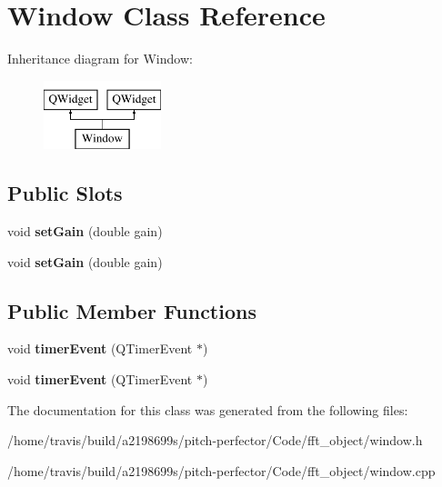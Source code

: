 \hypertarget{classWindow}{\section{Window Class Reference}
\label{classWindow}
}
Inheritance diagram for Window\-:\begin{figure}[H]
\begin{center}
\leavevmode
\includegraphics[height=2.000000cm]{classWindow}
\end{center}
\end{figure}
\subsection*{Public Slots}
\begin{DoxyCompactItemize}
\item 
\hypertarget{classWindow_a06531ce47a4206b3dbef30587e768b29}{void {\bfseries set\-Gain} (double gain)}\label{classWindow_a06531ce47a4206b3dbef30587e768b29}

\item 
\hypertarget{classWindow_a06531ce47a4206b3dbef30587e768b29}{void {\bfseries set\-Gain} (double gain)}\label{classWindow_a06531ce47a4206b3dbef30587e768b29}

\end{DoxyCompactItemize}
\subsection*{Public Member Functions}
\begin{DoxyCompactItemize}
\item 
\hypertarget{classWindow_a3656e486c467d9d7c7933812fb4b8f57}{void {\bfseries timer\-Event} (Q\-Timer\-Event $\ast$)}\label{classWindow_a3656e486c467d9d7c7933812fb4b8f57}

\item 
\hypertarget{classWindow_a3656e486c467d9d7c7933812fb4b8f57}{void {\bfseries timer\-Event} (Q\-Timer\-Event $\ast$)}\label{classWindow_a3656e486c467d9d7c7933812fb4b8f57}

\end{DoxyCompactItemize}


The documentation for this class was generated from the following files\-:\begin{DoxyCompactItemize}
\item 
/home/travis/build/a2198699s/pitch-\/perfector/\-Code/fft\-\_\-object/window.\-h\item 
/home/travis/build/a2198699s/pitch-\/perfector/\-Code/fft\-\_\-object/window.\-cpp\end{DoxyCompactItemize}
